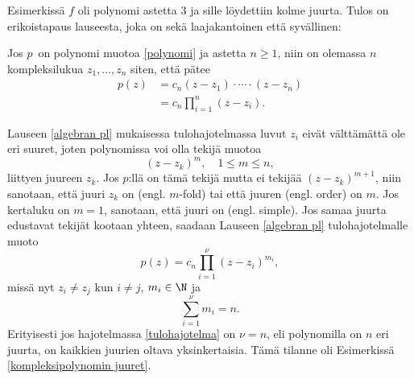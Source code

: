 Esimerkissä $f$ oli polynomi astetta 3 ja sille löydettiin kolme juurta. Tulos on
erikoistapaus lauseesta, joka on sekä laajakantoinen että syvällinen:
\begin{*Lause}  \label{algebran pl}
 Jos $p \, $ on polynomi muotoa \eqref{polynomi} ja astetta
$n \geq 1$, niin on olemassa $n$ kompleksilukua $z_1, \ldots, z_n$ siten, että pätee
\begin{align*}
p(z) &= c_n(z-z_1) \cdot \cdots \cdot (z-z_n) \\
     &= c_n \prod_{i=1}^n (z-z_i).
\end{align*}
\end{*Lause} 
Lauseen \ref{algebran pl} mukaisessa tulohajotelmassa luvut $z_i$ eivät välttämättä ole eri
suuret, joten polynomissa voi olla tekijä muotoa
\[
(z -z_k)^m, \quad 1 \leq m \leq n,
\]
liittyen juureen $z_k$. Jos $p$:llä on tämä tekijä mutta ei tekijää $(z -z_k)^{m+1}$, niin 
sanotaan, että juuri $z_k$ on  (engl. $m$-fold) tai että juuren 
 (engl. order) on $m$. Jos kertaluku on $m=1$, sanotaan, että juuri on 
%
 (engl. simple). Jos samaa juurta edustavat tekijät kootaan yhteen,
saadaan Lauseen \ref{algebran pl} tulohajotelmalle muoto
\begin{equation} \label{tulohajotelma}
p(z) = c_n \prod_{i=1}^ \nu (z -z_i)^{m_i},
\end{equation}
missä nyt $z_i \neq z_j$ kun $i \neq j$, $m_i \in \N$ ja
\[
\sum_{i=1}^ \nu m_i = n.
\]
Erityisesti jos hajotelmassa \eqref{tulohajotelma} on $\nu = n$, eli polynomilla on $n$ eri 
juurta, on kaikkien juurien oltava yksinkertaisia. Tämä tilanne oli Esimerkissä 
\ref{kompleksipolynomin juuret}.

